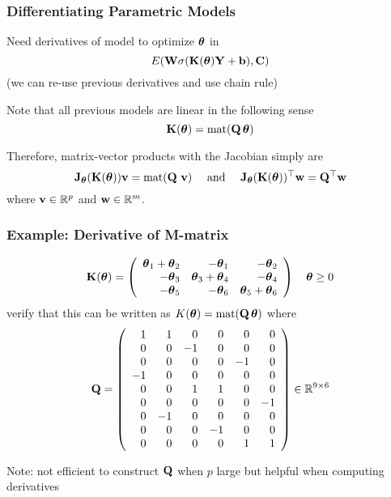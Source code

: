 \documentclass[12pt,fleqn,handout]{beamer}
\begin{document}
\begin{frame}
	\frametitle{Differentiating Parametric Models}
	Need derivatives of model to optimize ${\boldsymbol \theta}$ in
	$$
		E({\bf W} \sigma({\bf K}({\boldsymbol \theta}){\bf Y}+{\bf b}),{\bf C}) 
	$$
	(we can re-use previous derivatives and use chain rule)
	
	\bigskip
	\pause
	
	Note that all previous models are linear in the following sense
	$$
		{\bf K}({\boldsymbol \theta}) = {\rm mat}({\bf Q}\, {\boldsymbol \theta})
	$$
	
	\bigskip
	\pause
	
	Therefore, matrix-vector products with the Jacobian simply are
	$$
		{\bf J}_{\boldsymbol \theta} ({\bf K}({\boldsymbol \theta})) {\bf v}  = {\rm mat}({\bf Q} \ {\bf v})\quad\text{ and }\quad
		{\bf J}_{\boldsymbol \theta} ({\bf K}({\boldsymbol \theta}))^\top {\bf w}  = {\bf Q}^\top {\bf w}
	$$
	where ${\bf v} \in \mathbb{R}^p$ and ${\bf w} \in \mathbb{R}^m$.
\end{frame}

\begin{frame}\frametitle{Example: Derivative of M-matrix}
	$$
	{\bf K}({\boldsymbol \theta}) = \left(
			\begin{array}{rrr}
				{\boldsymbol \theta}_1+{\boldsymbol \theta}_2 & -{\boldsymbol \theta}_1 & -{\boldsymbol \theta}_2 \\
				-{\boldsymbol \theta}_3 & {\boldsymbol \theta}_3 + {\boldsymbol \theta}_4 & -{\boldsymbol \theta}_4 \\
				-{\boldsymbol \theta}_5 & -{\boldsymbol \theta}_6 & {\boldsymbol \theta}_5+{\boldsymbol \theta}_6
			\end{array}
		\right)
		\quad {\boldsymbol \theta} \geq 0
	$$
	\pause
	verify that this can be written as $K({\boldsymbol \theta}) = {\rm mat}({\bf Q} \, {\boldsymbol \theta})$ where
	$$
		{\bf Q} = \left(
			\begin{array}{rrrrrr}
				1 & 1 & 0 & 0 & 0 & 0 \\
				0 & 0 & -1& 0 & 0 & 0 \\
				0 & 0 & 0 & 0 &-1 & 0 \\
				-1& 0 & 0 & 0 & 0 & 0 \\
				0 & 0 & 1 & 1 & 0 & 0 \\
				0 & 0 & 0 & 0 & 0 &-1 \\
				0 &-1 & 0 & 0 & 0 & 0 \\
				0 & 0 & 0 & -1& 0 & 0 \\
				0 & 0 & 0 & 0 & 1 & 1
			\end{array}
		\right) \in \mathbb{R}^{9\times 6}
	$$
	\begin{center}
		Note: not efficient to construct ${\bf Q}$ when $p$ large but helpful when computing derivatives
	\end{center}
\end{frame}
\end{document}
